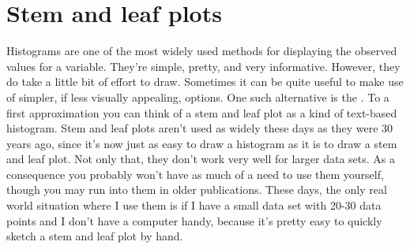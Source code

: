 \section{Stem and leaf plots~\label{sec:stem}}

Histograms are one of the most widely used methods for displaying the observed values for a variable. They're simple, pretty, and very informative. However, they do take a little bit of effort to draw. Sometimes it can be quite useful to make use of simpler, if less visually appealing, options. One such alternative is the . To a first approximation you can think of a stem and leaf plot as a kind of text-based histogram. Stem and leaf plots aren't used as widely these days as they were 30 years ago, since it's now just as easy to draw a histogram as it is to draw a stem and leaf plot. Not only that, they don't work very well for larger data sets. As a consequence you probably won't have as much of a need to use them yourself, though you may run into them in older publications. These days, the only real world situation where I use them is if I have a small data set with 20-30 data points and I don't have a computer handy, because it's pretty easy to quickly sketch a stem and leaf plot by hand. 

